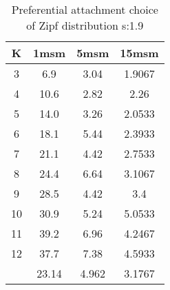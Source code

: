 \begin{table}[H]
\centering
\begin{tabular}{c|ccc}
K &1msm &5msm &15msm\\
\hline
3 & 6.9 & 3.04 & 1.9067\\
4 & 10.6 & 2.82 & 2.26\\
5 & 14.0 & 3.26 & 2.0533\\
6 & 18.1 & 5.44 & 2.3933\\
7 & 21.1 & 4.42 & 2.7533\\
8 & 24.4 & 6.64 & 3.1067\\
9 & 28.5 & 4.42 & 3.4\\
10 & 30.9 & 5.24 & 5.0533\\
11 & 39.2 & 6.96 & 4.2467\\
12 & 37.7 & 7.38 & 4.5933\\
\hline
& 23.14 & 4.962 & 3.1767\\
\end{tabular}
\caption{Preferential attachment choice of Zipf distribution s:1.9}
\label{tab:s1.9}
\end{table}
